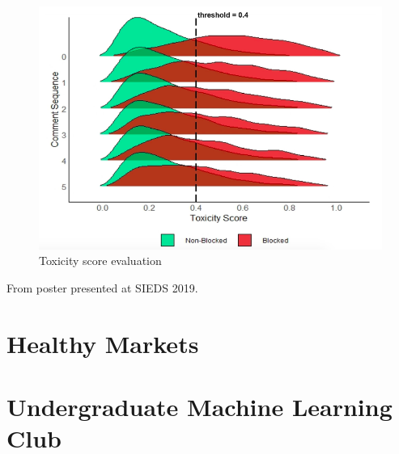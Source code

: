 \begin{figure}[!hbtp]
\includegraphics[width=\textwidth]{images/wiki2}
\caption{Toxicity score evaluation}
\end{figure}

From poster presented at SIEDS 2019.

\section{Healthy Markets}
\label{sec:hmt}

\section{Undergraduate Machine Learning Club}
\label{sec:mlc}


